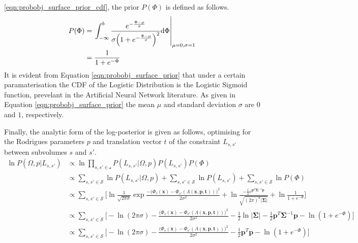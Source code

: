\ref{eqn:probobj_surface_prior_cdf}, the prior $P(\Phi)$ is defined as follows.
\begin{align}
  \label{eqn:probobj_surface_prior}
  P(\Phi) &= \left. \int_{-\infty}^{b} \frac
  {e^{-\frac{\Phi - \mu}{\sigma}}}
  {\sigma \Big( 1 + e^{-\frac{\Phi - \mu}{\sigma}} \Big)^{2}} {\mathrm d{\Phi}}
  \right\rvert_{\mu = 0, \sigma = 1}\\
  &= \frac{1}{1 + e^{-\Phi}}
\end{align}
It is evident from Equation \ref{eqn:probobj_surface_prior} that under a certain
paramaterisation the CDF of the Logistic Distribution is the Logistic Sigmoid
function, prevelant in the Artificial Neural Network literature. As given in
Equation \ref{eqn:probobj_surface_prior} the mean $\mu$ and standard deviation
$\sigma$ are $0$ and $1$, respectively.

Finally, the analytic form of the log-posterior is given as follows, optimising
for the Rodrigues parameters $p$ and translation vector $t$ of the constraint
$L_{s, s'}$ between subvolumes $s$ and $s'$.
\begin{align}
  \label{eqn:probobj_log_posterior}
  \ln P(\Omega, p | L_{s, s'}) &\propto \ln
  \prod_{s, s' \in \mathcal{s}} P(L_{s, s'} | \Omega, p)P(L_{s, s'})P(\Phi)\\
  &\propto \sum_{s, s' \in \mathcal{S}} \ln P(L_{s, s'} | \Omega, p) +
  \sum_{s, s' \in \mathcal{S}} \ln P(L_{s, s'}) +
  \sum_{s, s' \in \mathcal{S}} \ln P(\Phi)\\
  &\propto \sum_{s, s' \in \mathcal{S}} \Bigg[\ln \frac{1}{\sqrt{2 \pi \sigma}}
  \exp{\frac{-\big(\Phi_{s}(\mathbf{x}) - \Phi_{s'}
  (\Lambda(\mathbf{x}, \mathbf{p}, \mathbf{t}))\big)^{2}}
  {2\sigma^{2}}} +
  \ln \frac{-\frac{1}{2} e^{\mathbf{p}^{T}\mathbf{\Sigma}^{-1}\mathbf{p}}}
  {\sqrt{(2\pi)^{k}\left|\mathbf{\Sigma}\right|}} +
  \ln \frac{1}{1 + e^{-\Phi}}\Bigg]\\
  &\propto \sum_{s, s' \in \mathcal{S}} \Bigg[ -\ln(2\pi\sigma) -
  \frac{\big(\Phi_{s}(\mathbf{x}) -
  \Phi_{s'}(\Lambda(\mathbf{x}, \mathbf{p}, \mathbf{t}))\big)^{2}}{2\sigma^{2}} -
  \frac{1}{2} \ln \left|\mathbf{\Sigma}\right| -
  \frac{1}{2} \mathbf{p}^{T}\mathbf{\Sigma}^{-1}\mathbf{p} -
  \ln(1 + e^{-\Phi}) \Bigg]\\
  &\propto \sum_{s, s' \in \mathcal{S}} \Bigg[ -\ln(2\pi\sigma) -
  \frac{\big(\Phi_{s}(\mathbf{x}) -
  \Phi_{s'}(\Lambda(\mathbf{x}, \mathbf{p}, \mathbf{t}))\big)^{2}}{2\sigma^{2}} -
  \frac{1}{2} \mathbf{p}^{T}\mathbf{p} -
  \ln(1 + e^{-\Phi}) \Bigg]
\end{align}

